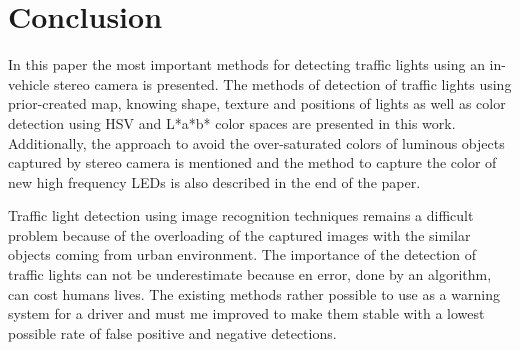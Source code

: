 \documentclass[letterpaper, 10 pt, conference]{ieeeconf} %
\begin{document}

\section{Conclusion}
In this paper the most important methods for detecting traffic lights using an in-vehicle stereo camera is presented. The methods of detection of traffic lights using prior-created map, knowing shape, texture and positions of lights as well as color detection using HSV and L*a*b* color spaces are presented in this work. Additionally, the approach to avoid the over-saturated colors of luminous objects captured by stereo camera is mentioned and the method to capture the color of new high frequency LEDs is also described in the end of the paper.

Traffic light detection using image recognition techniques remains a difficult problem because of the overloading of the captured images with the similar objects coming from urban environment. The importance of the detection of traffic lights can not be underestimate because en error, done by an algorithm, can cost humans lives. The existing methods rather possible to use as a warning system for a driver and must me improved to make them stable with a lowest possible rate of false positive and negative detections. 

\addtolength{\textheight}{-12cm} %


\end{document}
